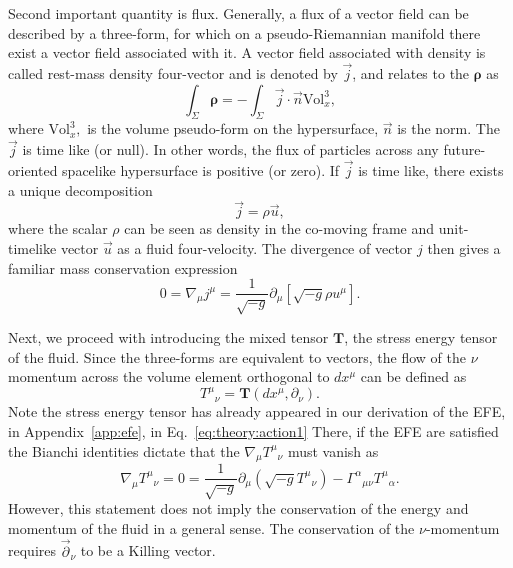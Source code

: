 Second important quantity is flux. 
Generally, a flux of a vector field can be described by a three-form, 
for which on a pseudo-Riemannian manifold there exist a vector field associated with it.
A vector field associated with density is called rest-mass density four-vector 
and is denoted by $\vec{j}$, and relates to the $\boldsymbol{\rho}$ as 
%
\begin{equation}
\int_{\Sigma} \boldsymbol{\rho} = - \int_{\Sigma}\vec{j}\cdot\vec{n}\text{Vol}_x ^3,
\end{equation}
%
where $\text{Vol}_x ^3,$ is the volume pseudo-form on the hypersurface, $\vec{n}$ is the norm.
%
The $\vec{j}$ is time like (or null). In other words, the flux of particles across any 
future-oriented spacelike hypersurface is positive (or zero). 
%
If $\vec{j}$ is time like, there exists a unique decomposition 
%
\begin{equation}
\vec{j} = \rho \vec{u},
\label{eq:theory:defofjandu}
\end{equation}
%
where the scalar $\rho$ can be seen as density in the co-moving frame and unit-timelike vector $\vec{u}$ as a fluid four-velocity.
The divergence of vector $j$ then gives a familiar mass conservation expression
%
\begin{equation}
0 = \nabla_{\mu}j^{\mu} = \frac{1}{\sqrt{-g}}\partial_{\mu}[\sqrt{-g}\rho u^{\mu}].
\label{eq:theory:nablamu_jmu}
\end{equation}


Next, we proceed with introducing the mixed tensor $\boldsymbol{T}$, 
the stress energy tensor of the fluid.
%
Since the three-forms are equivalent to vectors, the flow of the $\nu$ momentum across 
the volume element orthogonal to $dx^{\mu}$ can be defined as
%
\begin{equation}
{T^{\mu}}_{\nu}=\boldsymbol{T}(dx^{\mu},\partial_{\nu}).
\end{equation}
%
Note the stress energy tensor has already appeared in our derivation of the 
\ac{EFE}, in Appendix~\ref{app:efe}, in Eq.~\eqref{eq:theory:action1}
There, if the \ac{EFE} are satisfied the Bianchi identities dictate that the 
$\nabla_{\mu}{T^{\mu}}_{\nu}$ must vanish as
%
\begin{equation}
\nabla_{\mu}{T^{\mu}}_{\nu} = 0= \frac{1}{\sqrt{-g}}\partial_{\mu}(\sqrt{-g}{T^{\mu}}_{\nu}) - {\Gamma^{\alpha}}_{\mu\nu}{T^{\mu}}_{\alpha}.
\label{eq:theory:nablamu_tmunu}
\end{equation}
%
However, this statement does not imply the conservation of the energy and 
momentum of the fluid in a general sense. The conservation of the $\nu$-momentum requires 
$\vec{\partial}_{\nu}$ to be a Killing vector.



